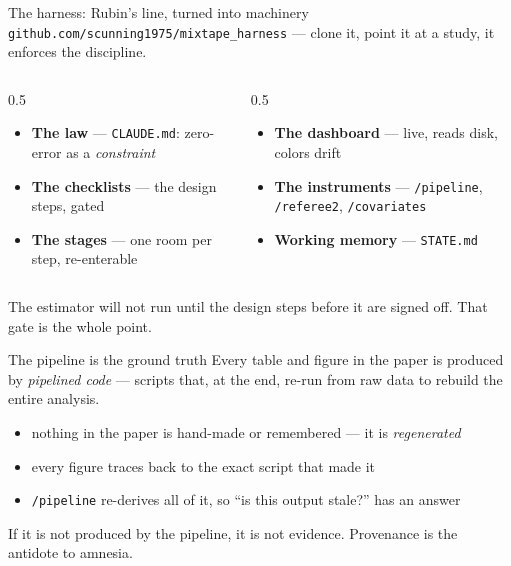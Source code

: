 \documentclass[aspectratio=169,11pt]{beamer}
\begin{document}
\begin{frame}{The harness: Rubin's line, turned into machinery}
\texttt{github.com/scunning1975/mixtape\_harness} --- clone it, point it at a study, it enforces the discipline.
\vspace{0.25cm}
\begin{columns}[T]
\begin{column}{0.5\textwidth}
\begin{itemize}\setlength\itemsep{0.18em}
    \item \textbf{The law} --- \texttt{CLAUDE.md}: zero-error as a \emph{constraint}
    \item \textbf{The checklists} --- the design steps, gated
    \item \textbf{The stages} --- one room per step, re-enterable
\end{itemize}
\end{column}
\begin{column}{0.5\textwidth}
\begin{itemize}\setlength\itemsep{0.18em}
    \item \textbf{The dashboard} --- live, reads disk, colors drift
    \item \textbf{The instruments} --- \texttt{/pipeline}, \texttt{/referee2}, \texttt{/covariates}
    \item \textbf{Working memory} --- \texttt{STATE.md}
\end{itemize}
\end{column}
\end{columns}
\vspace{0.25cm}

\alert{The estimator will not run until the design steps before it are signed off. That gate is the whole point.}
\end{frame}

\begin{frame}{The pipeline is the ground truth}
Every table and figure in the paper is produced by \emph{pipelined code} --- scripts that, at the end, re-run from raw data to rebuild the entire analysis.
\vspace{0.3cm}
\begin{itemize}\setlength\itemsep{0.22em}
    \item nothing in the paper is hand-made or remembered --- it is \emph{regenerated}
    \item every figure traces back to the exact script that made it
    \item \texttt{/pipeline} re-derives all of it, so ``is this output stale?'' has an answer
\end{itemize}
\vspace{0.25cm}

\alert{If it is not produced by the pipeline, it is not evidence. Provenance is the antidote to amnesia.}
\end{frame}
\end{document}
